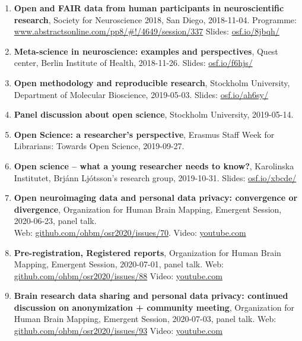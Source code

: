 \documentclass[10pt]{article}
\begin{document}
\begin{enumerate}[nolistsep]
\item \textbf{Open and FAIR data from human participants in neuroscientific research}, Society for Neuroscience 2018, San Diego, 2018-11-04.
Programme: \href{https://www.abstractsonline.com/pp8/\#!/4649/session/337}{www.abstractsonline.com/pp8/\#!/4649/session/337} Slides: \href{https://osf.io/8jbqh/}{osf.io/8jbqh/}
\item \textbf{Meta-science in neuroscience: examples and perspectives}, Quest center, Berlin Institute of Health, 2018-11-26. Slides: \href{https://osf.io/f6hjs/}{osf.io/f6hjs/}
\item \textbf{Open methodology and reproducible research}, Stockholm University, Department of Molecular Bioscience, 2019-05-03. Slides: \href{https://osf.io/ah6sy/}{osf.io/ah6sy/}
\item \textbf{Panel discussion about open science}, Stockholm University, 2019-05-14.
\item \textbf{Open Science: a researcher’s perspective}, Erasmus Staff Week for Librarians: Towards Open Science, 2019-09-27.
\item \textbf{Open science – what a young researcher needs to know?}, Karolinska Institutet, Brjánn Ljótsson's research group, 2019-10-31. Slides: \href{https://osf.io/xbcde/}{osf.io/xbcde/}
\item \textbf{Open neuroimaging data and personal data privacy: convergence or divergence}, Organization for Human Brain Mapping, Emergent Session, 2020-06-23, panel talk. \\
Web: \href{https://github.com/ohbm/osr2020/issues/70}{github.com/ohbm/osr2020/issues/70}. Video: \href{https://www.youtube.com/watch?v=A3BapxKPnRQ&list=PLVso6Qs8PLChTc8uMUWNSe_Bj4tfOHC_f&index=27}{youtube.com}
\item \textbf{Pre-registration, Registered reports}, Organization for Human Brain Mapping, Emergent Session, 2020-07-01, panel talk. Web: \href{https://github.com/ohbm/osr2020/issues/88}{github.com/ohbm/osr2020/issues/88} Video: \href{https://www.youtube.com/watch?v=-GKKiwMyfH8&list=PLVso6Qs8PLChTc8uMUWNSe_Bj4tfOHC_f&index=15}{youtube.com}
\item \textbf{Brain research data sharing and personal data privacy: continued discussion on anonymization + community meeting}, Organization for Human Brain Mapping, Emergent Session, 2020-07-03, panel talk. Web: \href{https://github.com/ohbm/osr2020/issues/93}{github.com/ohbm/osr2020/issues/93} Video: \href{https://www.youtube.com/watch?v=j9wFwBxwMvI&list=PLVso6Qs8PLChTc8uMUWNSe_Bj4tfOHC_f&index=16}{youtube.com}

\end{enumerate}
\end{document}
